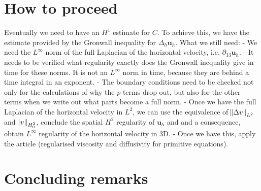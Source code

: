 \documentclass[11pt]{article}
\begin{document}
\section{How to proceed}

Eventually we need to have an $H^1$ estimate for $C$.
To achieve this, we have the estimate provided by the Gronwall inequality for $\Delta_h \mathbf{u}_h.$
What we still need:
 - We need the $L^\infty$ norm of the full Laplacian of the horizontal velocity, i.e. $\partial_{33} \mathbf{u}_h.$
 - It needs to be verified what regularity exactly does the Gronwall inequality give in time for these norms. It is not an $L^\infty$ norm in time, because they are behind a time integral in an exponent.
 - The boundary conditions need to be checked not only for the calculations of why the $p$ terms drop out, but also for the other terms when we write out what parts become a full norm.
 - Once we have the full Laplacian of the horizontal velocity in $L^2$, we can use the equivalence of $\norm{\Delta v}_{L^2}$ and $\norm{v}_{H^2_0}$, conclude the spatial $H^2$ regularity of $\mathbf{u}_h$ and and a consequence, obtain $L^\infty$ regularity of the horizontal velocity in 3D.
 - Once we have this, apply the article (regularised viscosity and diffusivity for primitive equations).
 

\section{Concluding remarks} \label{concludingremarks}

\nocite{*}


\end{document}
